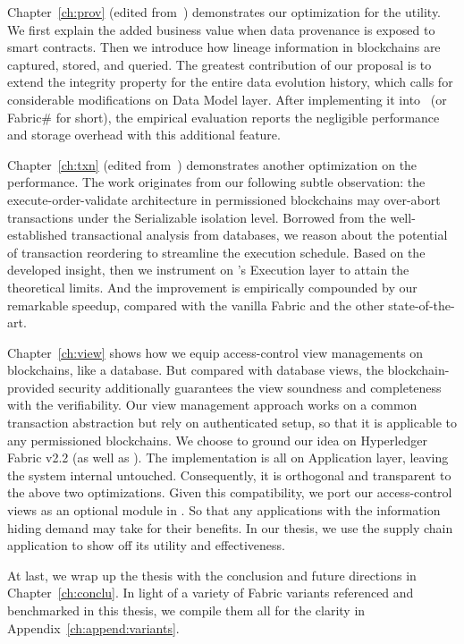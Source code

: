 Chapter~\ref{ch:prov} (edited from~\cite{ruan2019fine}) demonstrates our optimization for the utility. 
We first explain the added business value when data provenance is exposed to smart contracts. 
Then we introduce how lineage information in blockchains are captured, stored, and queried. 
The greatest contribution of our proposal is to extend the integrity property for the entire data evolution history, which calls for considerable modifications on Data Model layer. 
After implementing it into {\fs}~(or Fabric\# for short), the empirical evaluation reports the negligible performance and storage overhead with this additional feature. 

Chapter~\ref{ch:txn} (edited from~\cite{ruan2020transactional}) demonstrates another optimization on the performance. 
The work originates from our following subtle observation:
the execute-order-validate architecture in permissioned blockchains may over-abort transactions under the Serializable isolation level. 
Borrowed from the well-established transactional analysis from databases, we reason about the potential of transaction reordering to streamline the execution schedule. Based on the developed insight, then we instrument on {\fs}'s Execution layer to attain the theoretical limits. 
And the improvement is empirically compounded by our remarkable speedup, compared with the vanilla Fabric and the other state-of-the-art. 

Chapter~\ref{ch:view} shows how we equip access-control view managements on blockchains, like a database. But compared with database views, the blockchain-provided security additionally guarantees the view soundness and completeness with the verifiability. 
Our view management approach works on a common transaction abstraction but rely on authenticated setup, so that it is applicable to any permissioned blockchains. 
We choose to ground our idea on Hyperledger Fabric v2.2 (as well as {\fs}). 
The implementation is all on Application layer, leaving the system internal untouched. 
Consequently, it is orthogonal and transparent to the above two {\fs} optimizations. 
Given this compatibility, we port our access-control views as an optional module in {\fs}.
So that any applications with the information hiding demand may take for their benefits. 
In our thesis, we use the supply chain application to show off its utility and effectiveness.

At last, we wrap up the thesis with the conclusion and future directions in Chapter~\ref{ch:conclu}. 
In light of a variety of Fabric variants referenced and benchmarked in this thesis, we compile them all for the clarity in Appendix~\ref{ch:append:variants}. 

